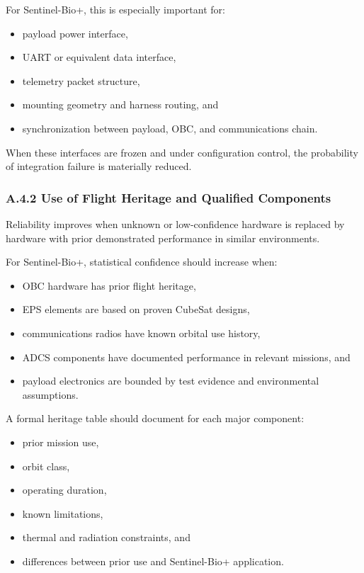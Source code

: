 \documentclass[11pt]{article}
\begin{document}
For Sentinel-Bio+, this is especially important for:

\begin{itemize}
    \item payload power interface,
    \item UART or equivalent data interface,
    \item telemetry packet structure,
    \item mounting geometry and harness routing, and
    \item synchronization between payload, OBC, and communications chain.
\end{itemize}

When these interfaces are frozen and under configuration control, the probability of integration failure
is materially reduced.

\subsubsection*{A.4.2 Use of Flight Heritage and Qualified Components}

Reliability improves when unknown or low-confidence hardware is replaced by hardware with prior
demonstrated performance in similar environments.

For Sentinel-Bio+, statistical confidence should increase when:

\begin{itemize}
    \item OBC hardware has prior flight heritage,
    \item EPS elements are based on proven CubeSat designs,
    \item communications radios have known orbital use history,
    \item ADCS components have documented performance in relevant missions, and
    \item payload electronics are bounded by test evidence and environmental assumptions.
\end{itemize}

A formal heritage table should document for each major component:

\begin{itemize}
    \item prior mission use,
    \item orbit class,
    \item operating duration,
    \item known limitations,
    \item thermal and radiation constraints, and
    \item differences between prior use and Sentinel-Bio+ application.
\end{itemize}
\end{document}
